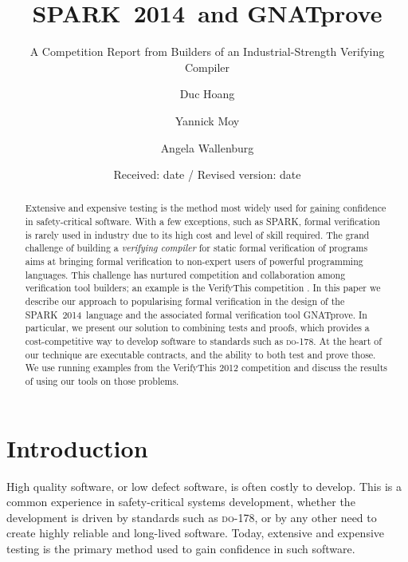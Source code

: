 \documentclass[sttt,final]{svjour}
\newcommand{\DO}{\textsc{do-178}}
\newcommand{\gnatprove}{GNATprove\xspace}
\newcommand{\newspark}{SPARK~2014\xspace}
\begin{document}
%
\title{\newspark\ and \gnatprove}
\subtitle{A Competition Report from Builders of an Industrial-Strength Verifying Compiler}
\author{Duc Hoang \and Yannick Moy \and Angela Wallenburg
}                     %

\date{Received: date / Revised version: date}
%
\maketitle
%
\begin{abstract}
  Extensive and expensive testing is the method most widely used for
  gaining confidence in safety-critical software. With a few
  exceptions, such as SPARK, formal verification is rarely used in
  industry due to its high cost and level of skill required. The grand
  challenge of building a \emph{verifying compiler} for static formal
  verification of programs aims at bringing formal verification to
  non-expert users of powerful programming languages. This challenge
  has nurtured competition and collaboration among verification tool
  builders; an example is the VerifyThis competition
  \cite{verifythis2012}. In this paper we describe our approach to
  popularising formal verification in the design of the
  \newspark\ language and the associated formal verification tool
  \gnatprove. In particular, we present our solution to combining
  tests and proofs, which provides a cost-competitive way to develop
  software to standards such as \DO.  At the heart of our technique are
  executable contracts, and the ability to both test and prove
  those. We use running examples from the VerifyThis 2012 competition
  and discuss the results of using our tools on those problems.
\end{abstract}
%
\section{Introduction}
\label{intro}
High quality software, or low defect software, is often costly to
develop. This is a common experience in safety-critical systems
development, whether the development is driven by standards such as
\DO, or by any other need to create highly reliable and long-lived
software. Today, extensive and expensive testing is the primary method
used to gain confidence in such software.
\end{document}
